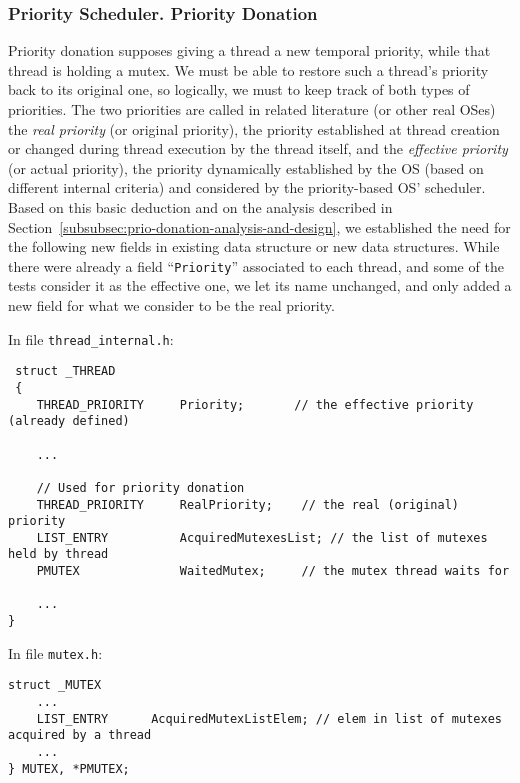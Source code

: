 \subsubsection{Priority Scheduler. Priority Donation}
\label{subsubsec:prio-donation-data-structures}

Priority donation supposes giving a thread a new temporal priority, while that thread is holding a mutex. We must be able to restore such a thread's priority back to its original one, so logically, we must to keep track of both types of priorities. The two priorities are called in related literature (or other real OSes) the \textit{real priority} (or original priority), the priority established at thread creation or changed during thread execution by the thread itself, and the \textit{effective priority} (or actual priority), the priority dynamically established by the OS (based on different internal criteria) and considered by the priority-based OS' scheduler. Based on this basic deduction and on the analysis described in Section~\ref{subsubsec:prio-donation-analysis-and-design}, we established the need for the following new fields in existing data structure or new data structures. While there were already a field ``\lstinline|Priority|'' associated to each thread, and some of the tests consider it as the effective one, we let its name unchanged, and only added a new field for what we consider to be the real priority.

In file \lstinline|thread_internal.h|:

\begin{lstlisting}
 struct _THREAD
 {
    THREAD_PRIORITY     Priority;       // the effective priority (already defined)

    ...
    
    // Used for priority donation
    THREAD_PRIORITY     RealPriority;    // the real (original) priority
    LIST_ENTRY          AcquiredMutexesList; // the list of mutexes held by thread
    PMUTEX              WaitedMutex;     // the mutex thread waits for
    
    ...
}
\end{lstlisting}

In file \lstinline|mutex.h|:

\begin{lstlisting}
struct _MUTEX
    ...
    LIST_ENTRY      AcquiredMutexListElem; // elem in list of mutexes acquired by a thread
    ...
} MUTEX, *PMUTEX;
\end{lstlisting}


